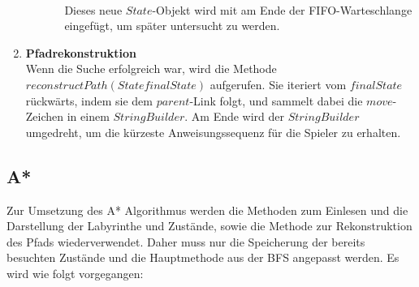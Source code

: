 \documentclass[a4paper,10pt,ngerman]{scrartcl}
\begin{document}
\begin{enumerate}
\begin{enumerate}
\begin{enumerate}
      \\ Dieses neue $State$-Objekt wird mit am Ende der FIFO-Warteschlange eingefügt, um später untersucht zu werden. 
    \end{enumerate}
  \end{enumerate}
  \item \textbf{Pfadrekonstruktion}\\
  Wenn die Suche erfolgreich war, wird die Methode $reconstructPath(State finalState)$ aufgerufen. Sie iteriert vom $finalState$ rückwärts, indem sie dem $parent$-Link folgt, und sammelt dabei die $move$-Zeichen in einem $StringBuilder$. Am Ende wird der $StringBuilder$ umgedreht, um die kürzeste Anweisungssequenz für die Spieler zu erhalten. 

\end{enumerate}

\subsection{A*}
Zur Umsetzung des A* Algorithmus werden die Methoden zum Einlesen und die Darstellung der Labyrinthe und Zustände, sowie die Methode zur Rekonstruktion des Pfads wiederverwendet. Daher muss nur die Speicherung der bereits besuchten Zustände und die Hauptmethode aus der BFS angepasst werden. Es wird wie folgt vorgegangen: 
\end{document}
